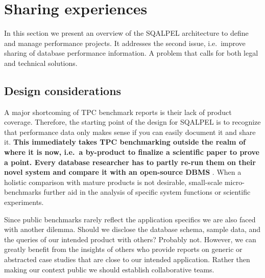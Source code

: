 \documentclass{cidr-2019}
\begin{document}


\section{Sharing experiences}\label{sharing}
In this section we present an overview of the {\sc SQALPEL}
architecture to define and manage performance projects. It addresses
the second issue, i.e.\ improve sharing of database performance
information. A problem that calls for both legal and technical
solutions.

\subsection{Design considerations}
A major shortcoming of TPC benchmark reports is their lack of product
coverage. Therefore, the starting point of the design for {\sc
  SQALPEL} is to recognize that performance data only makes sense if
you can easily document it and share it. {\bf This immediately takes
  TPC benchmarking outside the realm of where it is now, i.e.\ a
  by-product to finalize a scientific paper to prove a point. Every
  database researcher has to partly re-run them on their novel system
  and compare it with an open-source DBMS} . When a
holistic comparison with mature products is not desirable, small-scale
micro-benchmarks further aid in the analysis of specific system
functions or scientific experiments.

Since public benchmarks rarely reflect the application specifics we
are also faced with another dilemma. Should we disclose the database
schema, sample data, and the queries of our intended product with
others? Probably not. However, we can greatly
benefit from the insights of others who provide reports on generic or
abstracted case studies that are close to our intended
application. Rather then making our context public we should establish
collaborative teams.
\end{document}
